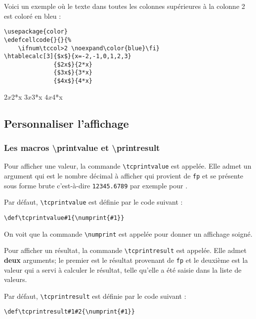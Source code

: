 \documentclass[a4paper,10pt]{article}
\newcommand\verbinline{\lstinline[breaklines=false,basicstyle=\normalsize\ttfamily]}
\newcommand\mywidth{0.85\linewidth}
\begin{document}
Voici un exemple où le texte dans toutes les colonnes supérieures à la colonne \no{}2 est coloré en bleu :
\begin{center}
\begin{minipage}{\mywidth}
\begin{lstlisting}
\usepackage{color}
\edefcellcode{}{}{%
	\ifnum\tccol>2 \noexpand\color{blue}\fi}
\htablecalc[3]{$x$}{x=-2,-1,0,1,2,3}
              {$2x$}{2*x}
              {$3x$}{3*x}
              {$4x$}{4*x}
\end{lstlisting}
\end{minipage}

\edefcellcode{}{}{%
	\ifnum\tccol>2 \noexpand\color{blue}\fi}
              {$2x$}{2*x}
              {$3x$}{3*x}
              {$4x$}{4*x}
\end{center}

\subsection{Personnaliser l'affichage}
\subsubsection{Les macros {\ttfamily\textbackslash printvalue} et {\ttfamily\textbackslash printresult}}\label{persoaffichage}
Pour afficher une valeur, la commande \verbinline|\tcprintvalue| est appelée. Elle admet un argument qui est le nombre décimal à afficher qui provient de \verb|fp| et se présente sous forme brute c'est-à-dire \verb|12345.6789| par exemple pour .

Par défaut, \verbinline|\tcprintvalue| est définie par le code suivant :\par\nobreak\smallskip
\hfill\verbinline|\def\tcprintvalue#1{\numprint{#1}}|\hfill{}
\smallskip

On voit que la commande \verb|\numprint| est appelée pour donner un affichage soigné.\bigskip

Pour afficher un résultat, la commande \verbinline|\tcprintresult| est appelée. Elle admet \textbf{deux} arguments; le premier est le résultat provenant de \verb|fp| et le deuxième est la valeur qui a servi à calculer le résultat, telle qu'elle a été saisie dans la liste de valeurs.

Par défaut, \verbinline|\tcprintresult| est définie par le code suivant :\par\nobreak\smallskip
\hfill\verbinline|\def\tcprintresult#1#2{\numprint{#1}}|\hfill{}
\smallskip
\end{document}
